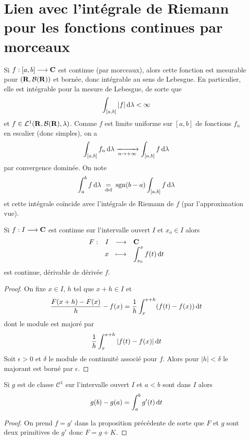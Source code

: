 \section{Lien avec l'intégrale de Riemann pour les fonctions continues par morceaux}

Si $f:[a, b] \longrightarrow \mathbf C$ est continue (par morceaux), alors cette fonction est mesurable pour $(\mathbf R, \mathcal  B(\mathbf R))$ et bornée, donc intégrable au sens de Lebesgue. En particulier, elle est intégrable pour la mesure de Lebesgue, de sorte que \[
\int_{[a, b]}|f|\mathop{}\!\mathrm d\lambda <\infty
\]
et $f \in  \mathcal  L^1(\mathbf R, \mathcal  B(\mathbf R), \lambda)$. Comme $f$ est limite uniforme sur  $[a, b]$ de fonctions  $f_n$ en escalier (donc simples), on a  \[
    \int_{[a, b]}f_n\mathop{}\!\mathrm d\lambda \xrightarrow[n\to+\infty]{} \int_{[a, b]}f\mathop{}\!\mathrm d\lambda
\] 
par convergence dominée. On note \[
    \int_a^bf\mathop{}\!\mathrm d\lambda \;\underset{\text{def}}=\;\mathrm{sgn}(b-a)\int_{[a, b]}f\mathop{}\!\mathrm d\lambda
\] 
et cette intégrale coïncide avec l'intégrale de Riemann de $f$ (par l'approximation vue).

\begin{prop}
Si $f:I \longrightarrow  \mathbf C$ est continue sur l'intervalle ouvert $I$ et  $x_o \in  I$ alors \[
\begin{array}{rrcl}
    F:& I & \longrightarrow & \mathbf C \\
      & x & \longmapsto & \displaystyle \int_{x_0}^x f(t)\mathop{}\!\mathrm d t
\end{array}
\] 
est continue, dérivable de dérivée $f$.
\end{prop}

\begin{proof}
On fixe $x \in  I$, $h$ tel que  $x+h \in  I$ et \[
    \frac{F(x+h)-F(x)}{h}-f(x)=\frac{1}{h}\int_{x}^{x+h}(f(t)-f(x))\mathop{}\!\mathrm d t
\] 
dont le module est majoré par \[
    \frac{1}{h} \int_x^{x+h}|f(t)-f(x)|\mathop{}\!\mathrm d t
\]
Soit $\epsilon>0$ et $\delta$ le module de continuité associé pour  $f$. Alors pour  $|h|<\delta$ le majorant est borné par  $\epsilon$.
\end{proof}

\begin{cor}
    Si $g$ est de classe  $\mathcal  C^1$ sur l'intervalle ouvert $I$ et  $a<b$ sont dans  $I$ alors  \[
        g(b)-g(a)=\int_a^b g'(t)\mathop{}\!\mathrm d t
    \]
\end{cor}

\begin{proof}
On prend $f=g'$ dans la proposition précédente de sorte que $F$ et  $g$ sont deux primitives de  $g'$ donc  $F=g+K$.
\end{proof}

